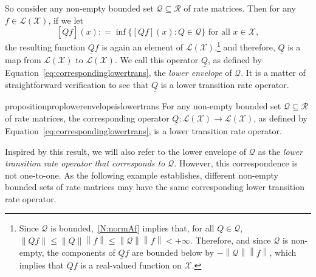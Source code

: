 \documentclass[10pt,a4paper]{paper}
\theoremstyle{definition}
\newcommand{\states}{\mathcal{X}}
\newcommand{\gambles}{\mathcal{L}}
\newcommand{\gamblesX}{\gambles(\states)}
\newcommand{\rateset}{\mathcal{Q}}
\newcommand{\lrate}{\underline{Q}}
\newcommand{\norm}[1]{\left\lVert #1 \right\rVert}
\newcommand{\coloneqq}{:\!=}
\begin{document}
So consider any non-empty bounded set $\rateset\subseteq\mathcal{R}$ of rate matrices. Then for any $f\in\gamblesX$, if we let
\begin{equation}\label{eq:correspondinglowertrans}
[\lrate f](x)\coloneqq\inf\{[Qf](x)\colon Q\in\rateset\}
\text{ for all $x\in\states$},%
\end{equation}
the resulting function $\lrate f$ is again an element of $\gamblesX$,\footnote{Since $\rateset$ is bounded,~\ref{N:normAf} implies that, for all $Q\in\rateset$, $\norm{Qf}\leq\norm{Q}\norm{f}\leq\norm{\rateset}\norm{f}<+\infty$. Therefore, and since $\rateset$ is non-empty, the components of $\lrate f$ are bounded below by $-\norm{\rateset}\norm{f}$, which implies that $\lrate f$ is a real-valued function on $\states$.}
and therefore, $\lrate$ is a map from $\gamblesX$ to $\gamblesX$. We call this operator $\lrate$, as defined by Equation~\eqref{eq:correspondinglowertrans}, the \emph{lower envelope} of $\rateset$. It is a matter of straightforward verification to see that $\lrate$ is a lower transition rate operator.

\begin{restatable}{proposition}{proplowerenvelopeislowertrans}
\label{prop:lowerenvelopeislowertrans}
For any non-empty bounded set $\rateset\subseteq\mathcal{R}$ of rate matrices, the corresponding operator $\lrate\colon\gamblesX\to\gamblesX$, as defined by Equation~\eqref{eq:correspondinglowertrans}, is a lower transition rate operator.
\end{restatable}

\noindent
Inspired by this result, we will also refer to the lower envelope of $\rateset$ as the \emph{lower transition rate operator that corresponds to $\rateset$}.  
However, this correspondence is not one-to-one. As the following example establishes, different non-empty bounded sets of rate matrices may have the same corresponding lower transition rate operator.
\end{document}
